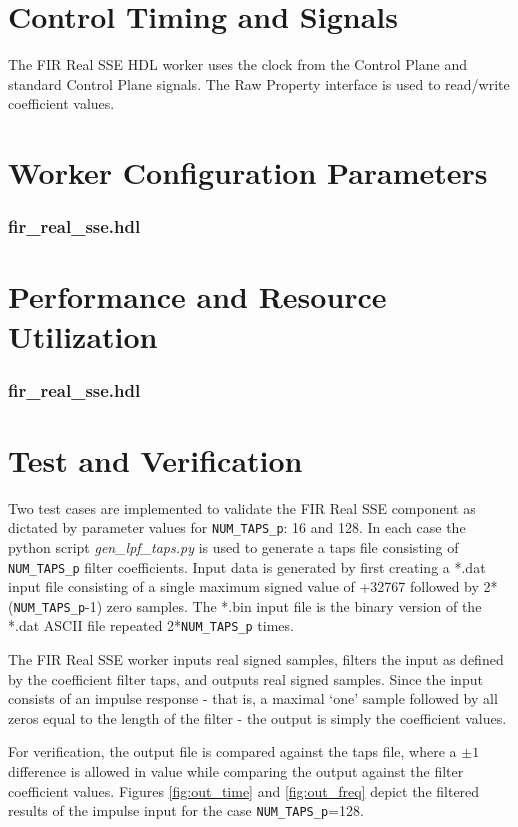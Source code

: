 \documentclass{article}
\def\comp{fir\_real\_sse}
\edef\ecomp{fir_real_sse}
\begin{document}
\section*{Control Timing and Signals}
\begin{flushleft}
	The FIR Real SSE HDL worker uses the clock from the Control Plane and standard Control Plane signals. The Raw Property interface is used to read/write coefficient values.
\end{flushleft}

\begin{landscape}
\section*{Worker Configuration Parameters}
\subsubsection*{\comp.hdl}
%
\section*{Performance and Resource Utilization}
\subsubsection*{\comp.hdl}
%
\end{landscape}
\section*{Test and Verification}

\begin{flushleft}
Two test cases are implemented to validate the FIR Real SSE component as dictated by parameter values for \verb+NUM_TAPS_p+: 16 and 128. In each case the python script \textit{gen\_lpf\_taps.py} is used to generate a taps file consisting of \verb+NUM_TAPS_p+ filter coefficients. Input data is generated by first creating a *.dat input file consisting of a single maximum signed value of +32767 followed by 2*(\verb+NUM_TAPS_p+-1) zero samples. The *.bin input file is the binary version of the *.dat ASCII file repeated 2*\verb+NUM_TAPS_p+ times.\medskip

The FIR Real SSE worker inputs real signed samples, filters the input as defined by the coefficient filter taps, and outputs real signed samples. Since the input consists of an impulse response - that is, a maximal `one' sample followed by all zeros equal to the length of the filter - the output is simply the coefficient values.\medskip

For verification, the output file is compared against the taps file, where a $\pm1$ difference is allowed in value while comparing the output against the filter coefficient values. Figures \ref{fig:out_time} and \ref{fig:out_freq} depict the filtered results of the impulse input for the case \verb+NUM_TAPS_p+=128.
\end{flushleft}
\end{document}
